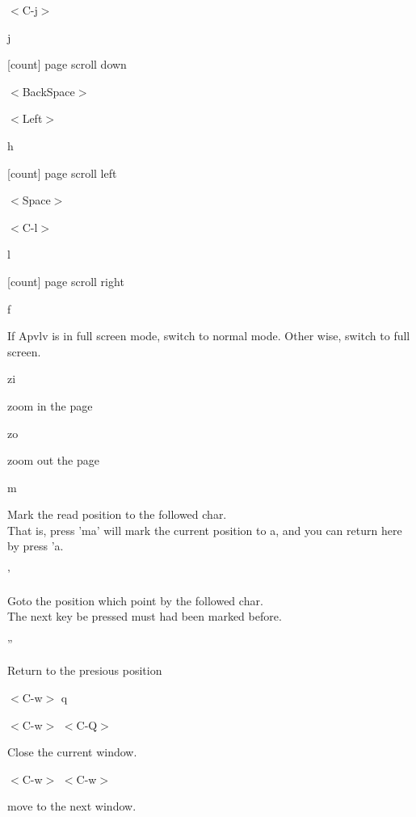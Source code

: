\documentclass[a4paper,12pt]{article}
\begin{document}
\begin{description}
\item $<$C-j$>$

\item j

[count] page scroll down

\item $<$BackSpace$>$

\item $<$Left$>$

\item h

[count] page scroll left

\item $<$Space$>$

\item $<$C-l$>$

\item l

[count] page scroll right

\item f

If Apvlv is in full screen mode, switch to normal mode. Other wise, switch to full screen.

\item zi

zoom in the page

\item zo

zoom out the page

\item m

Mark the read position to the followed char. \\
That is, press 'ma' will mark the current position to a, and you can return here by press 'a.

\item '

Goto the position which point by the followed char. \\
The next key be pressed must had been marked before. 

\item ''

Return to the presious position

\item $<$C-w$>$ q
\item $<$C-w$>$ $<$C-Q$>$

Close the current window.

\item $<$C-w$>$ $<$C-w$>$

move to the next window.


\end{description}
\end{document}
